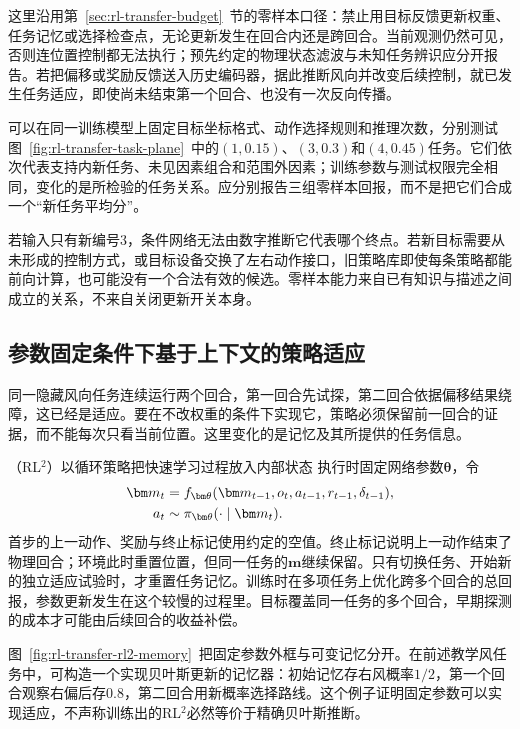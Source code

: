 这里沿用第~\ref{sec:rl-transfer-budget}~节的零样本口径：禁止用目标反馈更新权重、任务记忆或选择检查点，无论更新发生在回合内还是跨回合。当前观测仍然可见，否则连位置控制都无法执行；预先约定的物理状态滤波与未知任务辨识应分开报告。若把偏移或奖励反馈送入历史编码器，据此推断风向并改变后续控制，就已发生任务适应，即使尚未结束第一个回合、也没有一次反向传播。

可以在同一训练模型上固定目标坐标格式、动作选择规则和推理次数，分别测试图~\ref{fig:rl-transfer-task-plane}~中的$(1,0.15)$、$(3,0.3)$和$(4,0.45)$任务。它们依次代表支持内新任务、未见因素组合和范围外因素；训练参数与测试权限完全相同，变化的是所检验的任务关系。应分别报告三组零样本回报，而不是把它们合成一个“新任务平均分”。

若输入只有新编号3，条件网络无法由数字推断它代表哪个终点。若新目标需要从未形成的控制方式，或目标设备交换了左右动作接口，旧策略库即使每条策略都能前向计算，也可能没有一个合法有效的候选。零样本能力来自已有知识与描述之间成立的关系，不来自关闭更新开关本身。

\subsection{参数固定条件下基于上下文的策略适应}
\label{sec:rl-transfer-context-adaptation}

同一隐藏风向任务连续运行两个回合，第一回合先试探，第二回合依据偏移结果绕障，这已经是适应。要在不改权重的条件下实现它，策略必须保留前一回合的证据，而不能每次只看当前位置。这里变化的是记忆及其所提供的任务信息。

（RL$^2$）以循环策略把快速学习过程放入内部状态
执行时固定网络参数$\bm\theta$，令
\begin{align}
 \bm m_t
 &=f_{\bm\theta}(\bm m_{t-1},o_t,a_{t-1},r_{t-1},\delta_{t-1}),\notag\\
 a_t&\sim\pi_{\bm\theta}(\cdot\mid\bm m_t).
 \label{eq:rl-transfer-rl2}
\end{align}
首步的上一动作、奖励与终止标记使用约定的空值。终止标记说明上一动作结束了物理回合；环境此时重置位置，但同一任务的$\bm m$继续保留。只有切换任务、开始新的独立适应试验时，才重置任务记忆。训练时在多项任务上优化跨多个回合的总回报，参数更新发生在这个较慢的过程里。目标覆盖同一任务的多个回合，早期探测的成本才可能由后续回合的收益补偿。

图~\ref{fig:rl-transfer-rl2-memory}~把固定参数外框与可变记忆分开。在前述教学风任务中，可构造一个实现贝叶斯更新的记忆器：初始记忆存右风概率$1/2$，第一个回合观察右偏后存$0.8$，第二回合用新概率选择路线。这个例子证明固定参数可以实现适应，不声称训练出的RL$^2$必然等价于精确贝叶斯推断。

